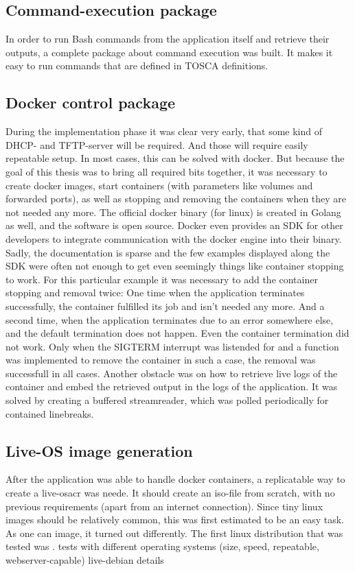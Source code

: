 \subsection{Command-execution package}
In order to run Bash commands from the application itself and retrieve their outputs, a complete package about command execution was built. It makes it easy to run commands that are defined in TOSCA definitions.

\subsection{Docker control package}
During the implementation phase it was clear very early, that some kind of DHCP- and TFTP-server will be required. And those will require easily repeatable setup. In most cases, this can be solved with docker. But because the goal of this thesis was to bring all required bits together, it was necessary to create docker images, start containers (with parameters like volumes and forwarded ports), as well as stopping and removing the containers when they are not needed any more.
\newline
The official docker binary (for linux) is created in Golang as well, and the software is open source. Docker even provides an SDK for other developers to integrate communication with the docker engine into their binary.
Sadly, the documentation is sparse and the few examples displayed along the SDK were often not enough to get even seemingly things like container stopping to work. For this particular example it was necessary to add the container stopping and removal twice: One time when the application terminates successfully, the container fulfilled its job and isn't needed any more. And a second time, when the application terminates due to an error somewhere else, and the default termination does not happen. Even  the container termination did not work. Only when the SIGTERM interrupt was  listended for and a function was implemented to remove the container in such a case, the removal was successfull in all cases.
\newline
Another obstacle was on how to retrieve live logs of the container and embed the retrieved output in the logs of the application. It was solved by creating a buffered streamreader, which was polled periodically for contained linebreaks.

\subsection{Live-OS image generation}
After the application was able to handle docker containers, a replicatable way to create a live-\gls{osacr} was neede. It should create an iso-file from scratch, with no previous requirements (apart from an internet connection). Since tiny linux images should be relatively common, this was first estimated to be an easy task.
\newline
As one can image, it turned out differently. The first linux distribution that was tested was .
tests with different operating systems (size, speed, repeatable, webserver-capable)
\newline
live-debian details

